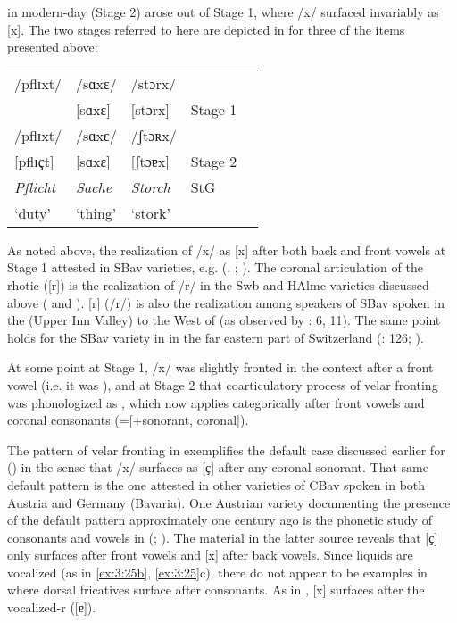  in modern-day  (Stage 2) arose out of Stage 1, where /x/ surfaced invariably as [x]. The two stages referred to here are depicted in  for three of the items presented above:

\ea%
    \label{ex:3:30}
\begin{tabular}[t]{@{}p{2cm}p{2cm}p{2cm}p{2cm}>{\raggedleft\arraybackslash}p{8mm}@{}}
  /pflɪxt/   & /sɑxɛ/  &  /stɔrx/  &          \\\relax
  [pflɪxt]   & [sɑxɛ]  &  [stɔrx]  &   Stage 1\\\tablevspace
  /pflɪxt/   &  /sɑxɛ/ &  /ʃtɔʀx/  &          \\\relax
  [pflɪ{ҫt]} &  [sɑxɛ] &  [ʃtɔɐx]  &  Stage 2\\\tablevspace
   \textit{Pflicht} & \textit{Sache}   &    \textit{Storch} & StG\\
  ‘duty’            &   ‘thing’        &     ‘stork’        &       \\
\end{tabular}
\z 

As noted above, the realization of /x/ as [x] after both back and front vowels at Stage 1 attested in SBav varieties, e.g.  (\citealt{Schatz1897}, \citealt{Hathaway1979}; ). The coronal articulation of the rhotic ([r]) is the realization of /r/ in the Swb and HAlmc varieties discussed above ( and ). [r] (/r/) is also the realization among speakers of SBav spoken in the  (Upper Inn Valley) to the West of  (as observed by \citealt{Schatz1897}: 6, 11). The same point holds for the SBav variety in  in the far eastern part of Switzerland (\citealt{Gröger1924}: 126; ).

At some point at Stage 1, /x/ was slightly fronted in the context after a front vowel (i.e. it was ), and at Stage 2 that coarticulatory process of velar fronting was phonologized as , which now applies categorically after front vowels and coronal consonants (=[+sonorant, coronal]).

The pattern of velar fronting in  exemplifies the default case discussed earlier for  () in the sense that /x/ surfaces as [{ҫ}] after any coronal sonorant. That same default pattern is the one attested in other varieties of CBav spoken in both Austria and Germany (Bavaria). One Austrian variety documenting the presence of the default pattern approximately one century ago is the phonetic study of consonants and vowels in  (\citealt{Pfalz1911}; ). The material in the latter source reveals that [{ҫ}] only surfaces after front vowels and [x] after back vowels. Since liquids are vocalized (as in \ref{ex:3:25b}, \ref{ex:3:25}c), there do not appear to be examples in \citet{Pfalz1911} where dorsal fricatives surface after consonants. As in , [x] surfaces after the vocalized-r ([ɐ]).

